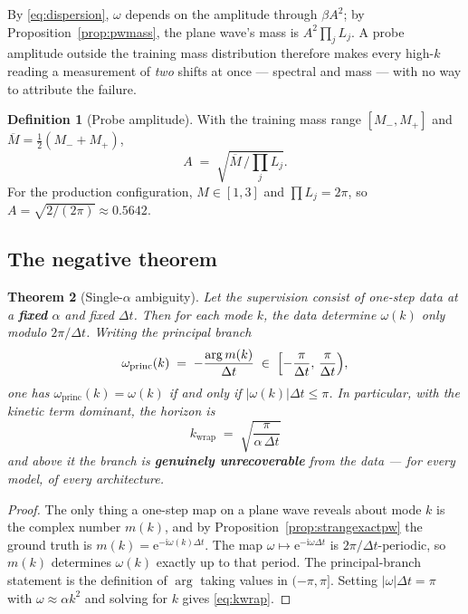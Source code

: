 \documentclass[11pt,a4paper]{article}
\theoremstyle{plain}
\newtheorem{theorem}{Theorem}[section]
\theoremstyle{definition}
\newtheorem{definition}[theorem]{Definition}
\theoremstyle{remark}
\newcommand{\iu}{\mathrm{i}}
\newcommand{\eu}{\mathrm{e}}
\newcommand{\dt}{\Delta t}
\newcommand{\kwrap}{k_{\mathrm{wrap}}}
\begin{document}
By \eqref{eq:dispersion}, $\omega$ depends on the amplitude through $\beta A^2$; by
Proposition~\ref{prop:pwmass}, the plane wave's mass is $A^2\prod_j L_j$. A probe
amplitude outside the training mass distribution therefore makes every high-$k$ reading a
measurement of \emph{two} shifts at once --- spectral and mass --- with no way to
attribute the failure.

\begin{definition}[Probe amplitude]
With the training mass range $[M_-,M_+]$ and $\overline{M}=\tfrac12(M_-+M_+)$,
\[
A \;=\; \sqrt{\overline{M}\,\Big/\!\prod_j L_j} .
\]
For the production configuration, $M\in[1,3]$ and $\prod L_j = 2\pi$, so
$A = \sqrt{2/(2\pi)} \approx 0.5642$.
\end{definition}

\subsection{The negative theorem}
\label{sec:wraptheorem}

\begin{theorem}[Single-$\alpha$ ambiguity]
\label{thm:wrap}
Let the supervision consist of one-step data at a \textbf{fixed} $\alpha$ and fixed
$\dt$. Then for each mode $k$, the data determine $\omega(k)$ only modulo $2\pi/\dt$.
Writing the principal branch
\[
\omega_{\mathrm{princ}}(k) \;=\; -\frac{\arg m(k)}{\dt} \;\in\; \Bigl[-\frac{\pi}{\dt},\,\frac{\pi}{\dt}\Bigr),
\]
one has $\omega_{\mathrm{princ}}(k) = \omega(k)$ if and only if $|\omega(k)|\dt \le\pi$.
In particular, with the kinetic term dominant, the horizon is
\begin{equation}
\label{eq:kwrap}
\boxed{\;\kwrap \;=\; \sqrt{\frac{\pi}{\alpha\,\dt}}\;}
\end{equation}
and above it the branch is \textbf{genuinely unrecoverable} from the data --- for every
model, of every architecture.
\end{theorem}

\begin{proof}
The only thing a one-step map on a plane wave reveals about mode $k$ is the complex
number $m(k)$, and by Proposition~\ref{prop:strangexactpw} the ground truth is
$m(k)=\eu^{-\iu\omega(k)\dt}$. The map $\omega\mapsto\eu^{-\iu\omega\dt}$ is
$2\pi/\dt$-periodic, so $m(k)$ determines $\omega(k)$ exactly up to that period. The
principal-branch statement is the definition of $\arg$ taking values in $(-\pi,\pi]$.
Setting $|\omega|\dt=\pi$ with $\omega\approx\alpha k^2$ and solving for $k$ gives
\eqref{eq:kwrap}.
\end{proof}
\end{document}
